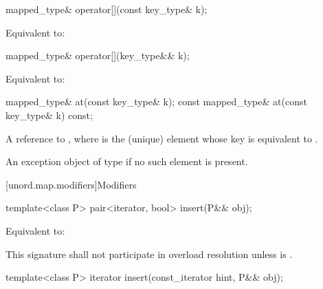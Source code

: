 %
%
\begin{itemdecl}
mapped_type& operator[](const key_type& k);
\end{itemdecl}

\begin{itemdescr}
\pnum
\effects Equivalent to: 
\end{itemdescr}

%
%
\begin{itemdecl}
mapped_type& operator[](key_type&& k);
\end{itemdecl}

\begin{itemdescr}
\pnum
\effects Equivalent to: 
\end{itemdescr}

%
%
\begin{itemdecl}
mapped_type& at(const key_type& k);
const mapped_type& at(const key_type& k) const;
\end{itemdecl}

\begin{itemdescr}
\pnum
\returns A reference to , where  is the (unique) element whose key is equivalent to .

\pnum
\throws An exception object of type  if no such element is present.
\end{itemdescr}

[unord.map.modifiers]{Modifiers}

%
\begin{itemdecl}
template<class P>
  pair<iterator, bool> insert(P&& obj);
\end{itemdecl}

\begin{itemdescr}
\pnum
\effects Equivalent to: 

\pnum
\remarks This signature shall not participate in overload resolution
unless  is .
\end{itemdescr}

%
\begin{itemdecl}
template<class P>
  iterator insert(const_iterator hint, P&& obj);
\end{itemdecl}

